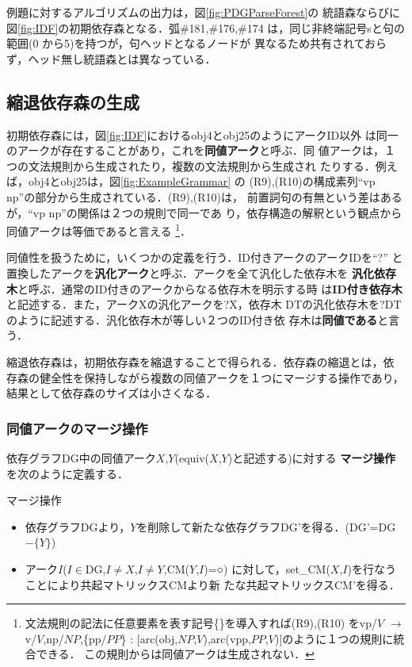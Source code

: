 例題に対するアルゴリズムの出力は，図\ref{fig:PDGParseForest}の
統語森ならびに図\ref{fig:IDF}の初期依存森となる．弧\#181,\#176,\#174 
は，同じ非終端記号sと句の範囲(0 から5)を持つが，句ヘッドとなるノードが
異なるため共有されておらず，ヘッド無し統語森とは異なっている．

\subsection{縮退依存森の生成}

初期依存森には，図\ref{fig:IDF}におけるobj4とobj25のようにアークID以外
は同一のアークが存在することがあり，これを{\bf 同値アーク}と呼ぶ．同
値アークは，１つの文法規則から生成されたり，複数の文法規則から生成され
たりする．例えば，obj4とobj25は，図\ref{fig:ExampleGrammar} の
(R9),(R10)の構成素列``vp np''の部分から生成されている．(R9),(R10)は，
前置詞句の有無という差はあるが，``vp np''の関係は２つの規則で同一であ
り，依存構造の解釈という観点から同値アークは等価であると言える
\footnote{文法規則の記法に任意要素を表す記号\{\}を導入すれば(R9),(R10) 
をvp/$V$ $\rightarrow$ v/$V$,np/$NP$,\{pp/$PP$\} :
[arc(obj,$NP$,$V$),arc(vpp,$PP$,$V$)]のように１つの規則に統合できる．
この規則からは同値アークは生成されない．}．


同値性を扱うために，いくつかの定義を行う．ID付きアークのアークIDを``?''
と置換したアークを{\bf 汎化アーク}と呼ぶ．アークを全て汎化した依存木を
{\bf 汎化依存木}と呼ぶ．通常のID付きのアークからなる依存木を明示する時
は{\bf ID付き依存木}と記述する．また，アークXの汎化アークを?X，依存木
DTの汎化依存木を?DTのように記述する．汎化依存木が等しい２つのID付き依
存木は{\bf 同値である}と言う．

縮退依存森は，初期依存森を縮退することで得られる．依存森の縮退とは，依
存森の健全性を保持しながら複数の同値アークを１つにマージする操作であり，
結果として依存森のサイズは小さくなる．

\subsubsection{同値アークのマージ操作}

依存グラフDG中の同値アーク$X$,$Y$(equiv($X$,$Y$)と記述する)に対する
{\bf マージ操作}を次のように定義する．
\begin{definition}
マージ操作
\begin{itemize}
\item[(1)] 依存グラフDGより，$Y$を削除して新たな依存グラフDG'を得る．(DG'=DG$-\{Y\}$)
\item[(2)] アーク$I$($I{\in}$DG,$I{\neq}X$,$I{\neq}Y$,CM($Y$,$I$)=○)
に対して，set\_CM($X$,$I$)を行なうことにより共起マトリックスCMより新
たな共起マトリックスCM'を得る．
\end{itemize}
\end{definition}

